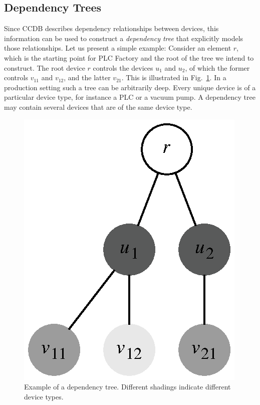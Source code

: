 \documentclass[a4paper,
              ]{jacow}
\begin{document}
\subsection{Dependency Trees}
Since CCDB describes dependency relationships between devices, this information can be used to construct a \emph{dependency tree} that explicitly models those relationships. Let us present a simple example: Consider an element $r$, which is the starting point for PLC Factory and the root of the tree we intend to construct. The root device $r$ controls the devices $u_1$ and $u_2$, of which the former controls $v_{11}$ and $v_{12}$, and the latter $v_{21}$. This is illustrated in Fig.\ \ref{fig:deviceTree}. In a production setting such a tree can be arbitrarily deep. Every unique device is of a particular device type, for instance a PLC or a vacuum pump. A dependency tree may contain several devices that are of the same device type.

\begin{figure}[h]
\centering
  \includegraphics[scale=0.8]{figures/deviceTreeCropped.eps}
  \caption{Example of a dependency tree. Different shadings indicate different device types.}
  \label{fig:deviceTree}
\end{figure}

\end{document}
